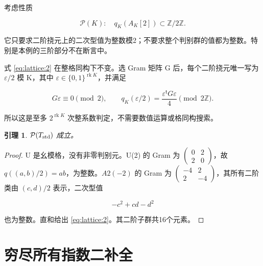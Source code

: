 \documentclass[11pt,a4paper,oneside]{ctexrep}
\theoremstyle{cnplain}
\newtheorem{lemma}[theorem]{引理}
\theoremstyle{definition}
\theoremstyle{remark}
\begin{document}
考虑性质

\begin{equation}
\mathcal P(K):\quad q_K(A_K[2])\subset\mathbb Z/2\mathbb Z.       \label{eq:lattice:2}
\end{equation}

它只要求二阶挠元上的二次型值为整数模2；不要求整个判别群的值都为整数。特别是本例的三阶部分不在断言中。

式 \eqref{eq:lattice:2} 在整格同构下不变。选 Gram 矩阵 G 后，每个二阶挠元唯一写为 \(\varepsilon/2\) 模 K，其中 \(\varepsilon\in\{0,1\}^{\operatorname{rk}K}\)，并满足

\begin{equation}
G\varepsilon\equiv0\pmod2,\qquad
 q_K(\varepsilon/2)=\frac{\varepsilon^{\mathsf t}G\varepsilon}{4}
                      \pmod{2\mathbb Z}.                         \label{eq:lattice:3}
\end{equation}

所以这是至多 \(2^{\operatorname{rk}K}\) 次整系数判定，不需要数值运算或格同构搜索。

\begin{lemma}

\(\mathcal P(T_{\rm std})\) 成立。

\end{lemma}

\begin{proof}

U 是幺模格，没有非零判别元。U(2) 的 Gram 为 \(\left(\begin{smallmatrix}0&2\\2&0\end{smallmatrix}\right)\)，故 \(q((a,b)/2)=ab\)，为整数。\(A2(- 2)\) 的 Gram 为 \(\left(\begin{smallmatrix}-4&2\\2&-4\end{smallmatrix}\right)\)，其所有二阶类由 \((c,d)/2\) 表示，二次型值

\begin{equation}
-c^2+cd-d^2
\end{equation}

也为整数。直和给出 \eqref{eq:lattice:2}。其二阶子群共16个元素。

\end{proof}

\section{穷尽所有指数二补全}\label{sec:lattice:3}
\end{document}
